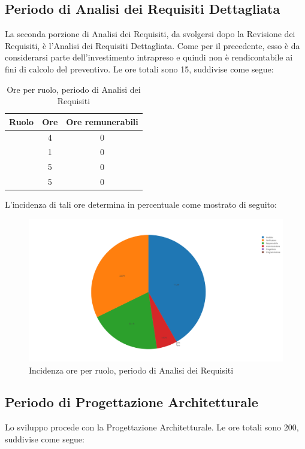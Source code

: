 \subsection{Periodo di Analisi dei Requisiti Dettagliata}
La seconda porzione di Analisi dei Requisiti, da svolgersi dopo la Revisione dei Requisiti, è l'Analisi dei Requisiti Dettagliata. Come per il precedente, esso è da considerarsi parte dell'investimento intrapreso e quindi non è rendicontabile ai fini di calcolo del preventivo. Le ore totali sono 15, suddivise come segue:

\begin{table}[H]
	\begin{center}
		\begin{tabular}{|c|c|c|}
			\hline
			\textbf{Ruolo}	& \textbf{Ore}	& \textbf{Ore remunerabili} \\
			\hline
			\Res	&   4 	&  0  \\
			\hline
			\Amm	&   1	&  0	\\
			\hline
			\Ana	&   5	&  0	\\
			\hline
			\Ver	&   5	&  0	\\
			\hline
		\end{tabular}
	\end{center}
	\caption{Ore per ruolo, periodo di Analisi dei Requisiti}
\end{table}

L'incidenza di tali ore determina in percentuale come mostrato di seguito:
\begin{figure}[H]
	\centering
	\includegraphics[scale=0.6]{img/AnalisiRequisiti.png}
	\caption{Incidenza ore per ruolo, periodo di Analisi dei Requisiti}
\end{figure}

\subsection{Periodo di Progettazione Architetturale}
Lo sviluppo procede con la Progettazione Architetturale. Le ore totali sono 200, suddivise come segue:


